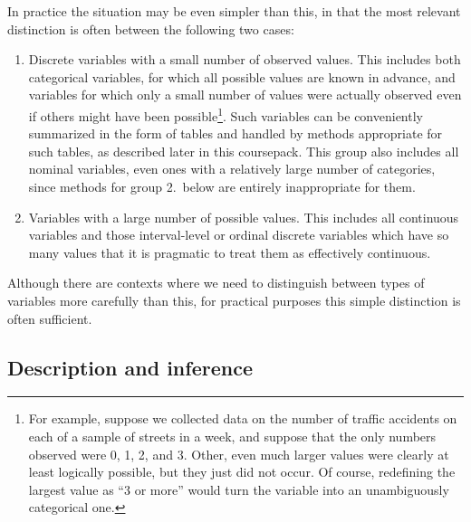 In practice the situation may be even simpler than this, in that
the most relevant distinction is often between the following two
cases:\label{p_2_variable_types}
\begin{enumerate}
\item
Discrete variables with a small number of observed values. This includes
both categorical variables, for which all possible values are known in
advance, and variables for which only a small number of values were
actually observed even if others might have been possible\footnote{
For example, suppose we collected data on the number of traffic
accidents on each of a sample of streets in a week, and suppose
that the only numbers observed were 0, 1, 2, and 3. Other,
even much larger values were clearly at least logically possible, but
they just did not occur. Of course, redefining the largest value as ``3
or more'' would turn the variable into an unambiguously
categorical one.}.
Such variables can be conveniently summarized
in the form of tables and handled by methods appropriate for such
tables, as described later in this coursepack.
This group also includes all nominal variables,
even ones with a relatively large number of categories, since methods
for group 2.\ below are entirely inappropriate for them.
\item
Variables with a large number of possible values. This includes all
continuous variables and those interval-level or ordinal discrete
variables which have so many values that it is pragmatic to treat them as effectively
continuous.
\end{enumerate}
Although there are contexts where we need to distinguish between types
of variables more carefully than this, for practical purposes
this simple distinction is often sufficient.

\subsection{Description and inference}
\label{ss_intro_def_descr}

